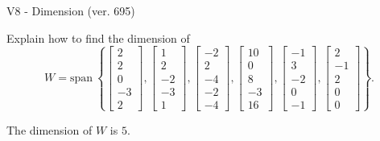 \begin{exercise}
  \begin{exerciseTitle}V8 - Dimension (ver. 695)\end{exerciseTitle}
  \begin{exerciseStatement}
    Explain how to find the dimension of 
\[W=\mathrm{span}\ \left\{\left[\begin{array}{r}
2 \\
2 \\
0 \\
-3 \\
2
\end{array}\right] , \left[\begin{array}{r}
1 \\
2 \\
-2 \\
-3 \\
1
\end{array}\right] , \left[\begin{array}{r}
-2 \\
2 \\
-4 \\
-2 \\
-4
\end{array}\right] , \left[\begin{array}{r}
10 \\
0 \\
8 \\
-3 \\
16
\end{array}\right] , \left[\begin{array}{r}
-1 \\
3 \\
-2 \\
0 \\
-1
\end{array}\right] , \left[\begin{array}{r}
2 \\
-1 \\
2 \\
0 \\
0
\end{array}\right]\right\}.\]



  \end{exerciseStatement}
  \begin{exerciseAnswer}
   The dimension of \(W\) is  \(5\).
  


  \end{exerciseAnswer}
\end{exercise}